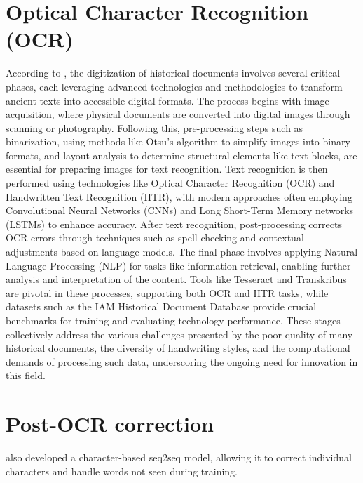 \label{chap:2_related_work}
\section{Optical Character Recognition (OCR)}
\label{sec:2_ocr_models}
According to \citep{philips2020historical}, the digitization of historical documents involves several critical phases, each leveraging advanced technologies and methodologies to transform ancient texts into accessible digital formats. The process begins with image acquisition, where physical documents are converted into digital images through scanning or photography. Following this, pre-processing steps such as binarization, using methods like Otsu’s algorithm to simplify images into binary formats, and layout analysis to determine structural elements like text blocks, are essential for preparing images for text recognition. Text recognition is then performed using technologies like Optical Character Recognition (OCR) and Handwritten Text Recognition (HTR), with modern approaches often employing Convolutional Neural Networks (CNNs) and Long Short-Term Memory networks (LSTMs) to enhance accuracy. After text recognition, post-processing corrects OCR errors through techniques such as spell checking and contextual adjustments based on language models. The final phase involves applying Natural Language Processing (NLP) for tasks like information retrieval, enabling further analysis and interpretation of the content. Tools like Tesseract and Transkribus are pivotal in these processes, supporting both OCR and HTR tasks, while datasets such as the IAM Historical Document Database provide crucial benchmarks for training and evaluating technology performance. These stages collectively address the various challenges presented by the poor quality of many historical documents, the diversity of handwriting styles, and the computational demands of processing such data, underscoring the ongoing need for innovation in this field.
\section{Post-OCR correction}
\label{post-ocr_correction}
\citep{mokhtar2018ocr} also developed a character-based seq2seq model, allowing it to correct individual characters and handle words not seen during training.
